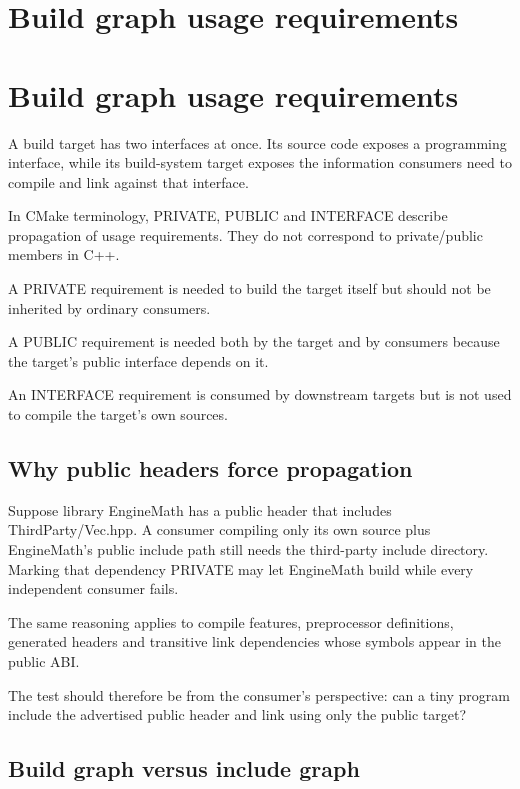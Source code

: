 \hypertarget{appendix-3327b8977adf}{}
\section*{Build graph usage requirements}
\section{Build graph usage requirements}\label{build-graph-usage-requirements}

A build target has two interfaces at once. Its source code exposes a programming interface, while its build-system target exposes the information consumers need to compile and link against that interface.

In CMake terminology, PRIVATE, PUBLIC and INTERFACE describe propagation of usage requirements. They do not correspond to private/public members in C++.

A PRIVATE requirement is needed to build the target itself but should not be inherited by ordinary consumers.

A PUBLIC requirement is needed both by the target and by consumers because the target's public interface depends on it.

An INTERFACE requirement is consumed by downstream targets but is not used to compile the target's own sources.

\subsection{Why public headers force propagation}\label{why-public-headers-force-propagation}

Suppose library EngineMath has a public header that includes ThirdParty/Vec.hpp. A consumer compiling only its own source plus EngineMath's public include path still needs the third-party include directory. Marking that dependency PRIVATE may let EngineMath build while every independent consumer fails.

The same reasoning applies to compile features, preprocessor definitions, generated headers and transitive link dependencies whose symbols appear in the public ABI.

The test should therefore be from the consumer's perspective: can a tiny program include the advertised public header and link using only the public target?

\subsection{Build graph versus include graph}\label{build-graph-versus-include-graph}

